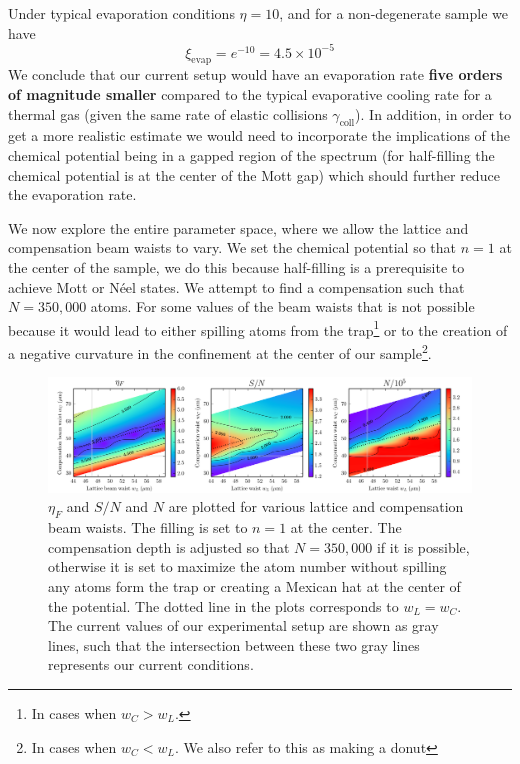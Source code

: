 \documentclass[11pt,letter]{article}
\begin{document}
Under typical evaporation conditions $\eta=10$, and for a non-degenerate sample
we have 
\begin{equation}
 \xi_{\text{evap}} = e^{-10} = 4.5\times 10^{-5} 
\end{equation}
We conclude that our current setup would  have an evaporation rate \textbf{five
orders of magnitude smaller} compared to the typical evaporative cooling rate
for a thermal gas (given the same rate of elastic collisions
$\gamma_{\text{coll}}$).   In addition, in order to get a more realistic
estimate we would need to incorporate the implications of the chemical
potential being in a gapped region of the spectrum (for half-filling the chemical
potential is at the center of the Mott gap) which should further reduce the
evaporation rate.  

We now explore the entire parameter space, where we allow the lattice and
compensation beam waists to vary.   We set the chemical potential so that $n=1$
at the center of the sample,  we do this because half-filling is a prerequisite
to achieve Mott or N\'{e}el states.   We attempt to find a compensation such
that $N=350,000$ atoms.  For some values of the beam waists that is not
possible because it would lead to either spilling atoms from the
trap\footnote{In cases when $w_{C}>w_{L}$.} or to the creation of a negative
curvature in the confinement at the center of our sample\footnote{In cases when
$w_{C} < w_{L}$.  We also refer to this as making a donut}.  
\begin{figure}
    \centering \includegraphics[width=\textwidth]{figures/etaF-wIRwGR.png}
\caption{$\eta_{F}$ and $S/N$ and $N$ are plotted for various lattice and
compensation beam waists.  The filling is set to $n=1$ at the center. The
compensation depth is adjusted so that  $N=350,000$ if it is possible, otherwise
it is set to maximize the atom number without spilling any atoms form the trap
or creating a Mexican hat at the center of the potential.  The dotted line in
the plots corresponds to $w_{L}=w_{C}$.  The current values of our
experimental setup are shown as gray lines,  such that the intersection between
these two gray lines represents our current conditions. }
\label{fig:etaF-wIRwGR}
\end{figure}
\end{document}
